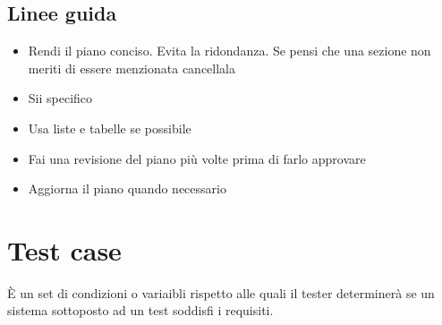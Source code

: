 \documentclass[11pt,a4paper]{book}
\begin{document}
\subsection{Linee guida}
\begin{itemize}
	\item Rendi il piano conciso. Evita la ridondanza. Se pensi che una sezione non meriti di essere menzionata cancellala
	\item Sii specifico
	\item Usa liste e tabelle se possibile
	\item Fai una revisione del piano più volte prima di farlo approvare
	\item Aggiorna il piano quando necessario
\end{itemize}

\section{Test case}
È un set di condizioni o variaibli rispetto alle quali il tester determinerà se un sistema sottoposto ad un test soddisfi i requisiti.
\end{document}
